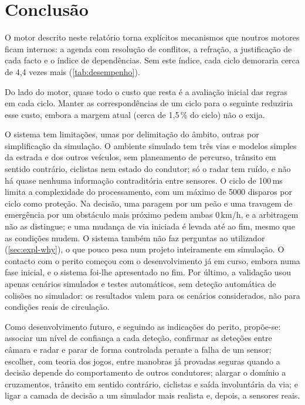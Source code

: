 \chapter{Conclusão}
\label{cap:conclusao}

O motor descrito neste relatório torna explícitos mecanismos que noutros motores
ficam internos: a agenda com resolução de conflitos, a refração, a justificação de
cada facto e o índice de dependências. Sem este índice, cada ciclo demoraria
cerca de 4,4 vezes mais (\cref{tab:desempenho}).

Do lado do motor, quase todo o custo que resta é a avaliação inicial das regras
em cada ciclo. Manter as correspondências de um ciclo para o seguinte reduziria esse custo,
embora a margem atual (cerca de 1,5\,\% do ciclo) não o exija.

O sistema tem limitações, umas por delimitação do âmbito, outras por
simplificação da simulação. O ambiente simulado tem três vias e modelos simples
da estrada e dos outros veículos, sem planeamento de percurso, trânsito em
sentido contrário, ciclistas nem estado do condutor; só o radar tem ruído, e
não há quase nenhuma informação contraditória entre sensores. O ciclo de 100\,ms
limita a complexidade do processamento, com um máximo de 5000 disparos por ciclo
como proteção. Na decisão, uma paragem por um peão e uma travagem de emergência por
um obstáculo mais próximo pedem ambas 0\,km/h, e a arbitragem não as distingue;
e uma mudança de via iniciada é levada até ao fim, mesmo que as condições
mudem. O sistema também não faz perguntas ao utilizador (\cref{sec:expl-why}),
o que pouco pesa num projeto inteiramente em simulação. O contacto com o perito
começou com o desenvolvimento já em curso, embora numa fase inicial, e o sistema
foi-lhe apresentado no fim. Por último, a validação usou apenas cenários
simulados e testes automáticos, sem deteção automática de colisões no
simulador: os resultados valem para os cenários considerados, não para
condições reais de circulação.

Como desenvolvimento futuro, e seguindo as indicações do perito, propõe-se:
associar um nível de confiança a cada deteção, confirmar as deteções entre
câmara e radar e parar de forma controlada perante a falha de um sensor;
escolher, com teoria dos jogos, entre manobras já provadas seguras quando a
decisão depende do comportamento de outros condutores; alargar o domínio a
cruzamentos, trânsito em sentido contrário, ciclistas e saída involuntária da
via; e ligar a camada de decisão a um simulador mais realista e, depois, a
sensores reais.
